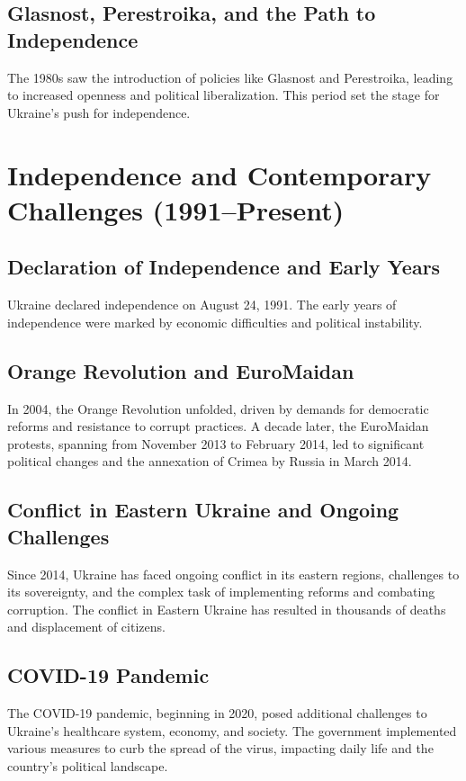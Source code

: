 \documentclass[a4paper,12pt]{book}
\begin{document}
\subsection{Glasnost, Perestroika, and the Path to Independence}
The 1980s saw the introduction of policies like Glasnost and Perestroika, leading to increased openness and political liberalization. This period set the stage for Ukraine's push for independence.

\section{Independence and Contemporary Challenges (1991–Present)}
\label{sec:independence-contemporary-challenges}
\subsection{Declaration of Independence and Early Years}
Ukraine declared independence on August 24, 1991. The early years of independence were marked by economic difficulties and political instability.

\subsection{Orange Revolution and EuroMaidan}
In 2004, the Orange Revolution unfolded, driven by demands for democratic reforms and resistance to corrupt practices. A decade later, the EuroMaidan protests, spanning from November 2013 to February 2014, led to significant political changes and the annexation of Crimea by Russia in March 2014.

\subsection{Conflict in Eastern Ukraine and Ongoing Challenges}
Since 2014, Ukraine has faced ongoing conflict in its eastern regions, challenges to its sovereignty, and the complex task of implementing reforms and combating corruption. The conflict in Eastern Ukraine has resulted in thousands of deaths and displacement of citizens.

\subsection{COVID-19 Pandemic}
The COVID-19 pandemic, beginning in 2020, posed additional challenges to Ukraine's healthcare system, economy, and society. The government implemented various measures to curb the spread of the virus, impacting daily life and the country’s political landscape.
\end{document}
